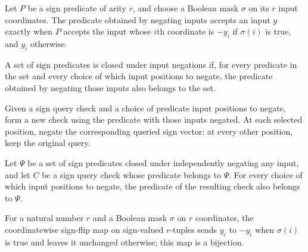 \begin{definition}
\label{FABL.SignPredicate.negateInputs}
\leanok
{}
Let $P$ be a sign predicate of arity $r$, and choose a Boolean mask $\sigma$ on its $r$
input coordinates. The predicate obtained by negating inputs accepts an input $y$
exactly when $P$ accepts the input whose $i$th coordinate is $-y_i$ if $\sigma(i)$ is
true, and $y_i$ otherwise.
\end{definition}

\begin{definition}
\label{FABL.IsClosedUnderInputNegations}
\leanok
{}
A set of sign predicates is closed under input negations if, for every predicate in the
set and every choice of which input positions to negate, the predicate obtained by
negating those inputs also belongs to the set.
\end{definition}

\begin{definition}
\label{FABL.SignQueryCheck.negateQueries}
\leanok
{}
Given a sign query check and a choice of predicate input positions to negate, form a new
check using the predicate with those inputs negated. At each selected position, negate
the corresponding queried sign vector; at every other position, keep the original query.
\end{definition}

\begin{theorem}
\label{FABL.SignQueryCheck.negateQueries_mem}
\leanok
{}
Let $\Psi$ be a set of sign predicates closed under independently negating any input,
and let $C$ be a sign query check whose predicate belongs to $\Psi$. For every choice of
which input positions to negate, the predicate of the resulting check also belongs to
$\Psi$.
\end{theorem}

\begin{definition}
\label{FABL.signInputNegationEquiv}
\leanok
{}
For a natural number $r$ and a Boolean mask $\sigma$ on $r$ coordinates, the
coordinatewise sign-flip map on sign-valued $r$-tuples sends $y_i$ to $-y_i$ when
$\sigma(i)$ is true and leaves it unchanged otherwise; this map is a bijection.
\end{definition}

